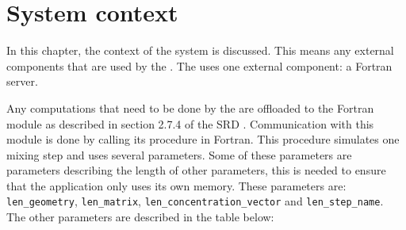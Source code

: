 \chapter{System context}
\label{chap:systcontext}
In this chapter, the context of the system is discussed. This means any external components that are used by the \applicationname{}. The \applicationname{} uses one external component: a Fortran server.

Any computations that need to be done by the \applicationname{} are offloaded to the Fortran module as described in section 2.7.4 of the SRD \cite{srd}. Communication with this module is done by calling its procedure in Fortran. This procedure simulates one mixing step and uses several parameters. Some of these parameters are parameters describing the length of other parameters, this is needed to ensure that the application only uses its own memory. These parameters are: \texttt{len\_geometry}, \texttt{len\_matrix}, \texttt{len\_concentration\_vector} and \texttt{len\_step\_name}. The other parameters are described in the table below:

\begin{center}
\end{center}
